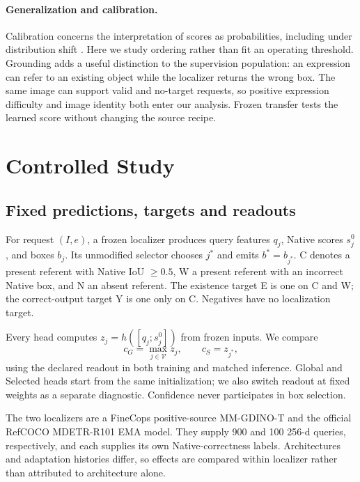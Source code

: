 \documentclass[10pt,twocolumn,letterpaper]{article}
\begin{document}
\paragraph{Generalization and calibration.}
Calibration concerns the interpretation of scores as probabilities, including
under distribution shift \cite{guo2017calibration,ovadia2019trust}.
Here we study ordering rather than fit an operating threshold. Grounding
adds a useful distinction to the supervision population: an expression can
refer to an existing object while the localizer returns the wrong box.
The same image can support valid and no-target requests, so positive
expression difficulty and image identity both enter our analysis.
Frozen transfer tests the learned score without changing the source recipe.

\section{Controlled Study}
\subsection{Fixed predictions, targets and readouts}
For request $(I,e)$, a frozen localizer produces query features $q_j$,
Native scores $s_j^0$, and boxes $b_j$. Its unmodified selector chooses
$j^*$ and emits $b^*=b_{j^*}$. C denotes a present referent with Native
IoU $\geq0.5$, W a present referent with an incorrect Native box, and N an
absent referent. The existence target E is one on C and W; the correct-output
target Y is one only on C. Negatives have no localization target.

Every head computes $z_j=h([q_j;s_j^0])$ from frozen inputs. We compare
\begin{equation}
c_G=\max_{j\in\mathcal V}z_j,\qquad c_S=z_{j^*},
\end{equation}
using the declared readout in both training and matched inference. Global
and Selected heads start from the same initialization; we also switch
readout at fixed weights as a separate diagnostic. Confidence never
participates in box selection.

The two localizers are a FineCops positive-source MM-GDINO-T and the official
RefCOCO MDETR-R101 EMA model. They supply 900 and 100 256-d queries,
respectively, and each supplies its own Native-correctness labels.
Architectures and adaptation histories differ, so effects are compared
within localizer rather than attributed to architecture alone.
\end{document}
